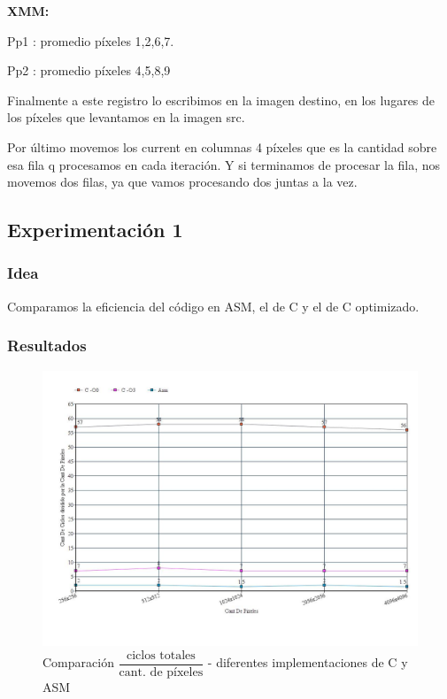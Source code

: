 \par{\textbf{XMM:}}
\par {Pp1 : promedio píxeles {1,2,6,7}.}
\par{Pp2 : promedio píxeles {4,5,8,9}}
	
\par{Finalmente a este registro lo escribimos en la imagen destino, en los lugares de los píxeles que levantamos en la imagen src.}
\par{Por último movemos los current en columnas 4 píxeles que es la cantidad sobre esa fila q procesamos en cada iteración. Y si terminamos de procesar la fila, nos movemos dos filas, ya que vamos procesando dos juntas a la vez.}
	
\subsection{Experimentación 1}

\subsubsection{Idea}	
\par{Comparamos la eficiencia del código en ASM, el de C y el de C optimizado.}
	
\subsubsection{Resultados}
	\begin{figure}[h!]
	\centering
	\includegraphics[width = 15 cm, height = 10 cm]{imagenes/pixeAsmC.jpg}
	\caption[center]{Comparación $\dfrac{\text{ciclos totales}}{\text{cant. de píxeles}}$ - diferentes implementaciones de C y ASM}
\end{figure}

